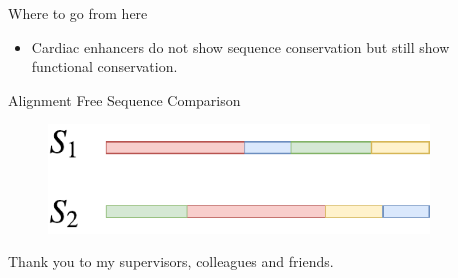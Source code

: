 \documentclass{beamer}
\begin{document}
    
    \begin{frame}{Where to go from here}
        \begin{itemize}
            \item Cardiac enhancers do not show sequence conservation but still show functional conservation.
        \end{itemize}
    \end{frame}
    
    \begin{frame}{Alignment Free Sequence Comparison}
        \begin{figure}
            \centering
            \includegraphics[width = 0.9\textwidth]{AlignmentFree.pdf}
            \label{fig:my_label}
        \end{figure}
    \end{frame}

    \begin{frame}
        Thank you to my supervisors, colleagues and friends.
    \end{frame}
    
\end{document}
